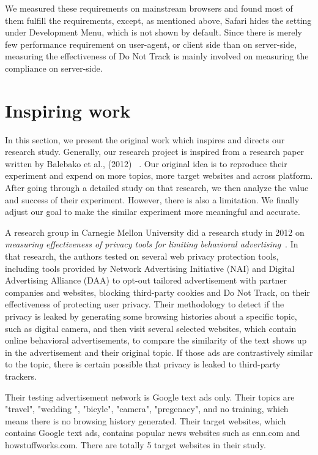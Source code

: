 \documentclass{sig-alternate}
\begin{document}
We measured these requirements on mainstream browsers and found most of them fulfill the requirements, except, as mentioned above, Safari hides the setting under Development Menu, which is not shown by default. Since there is merely few performance requirement on user-agent, or client side than on server-side, measuring the effectiveness of Do Not Track is mainly involved on measuring the compliance on server-side. 


\section{Inspiring work} \label{sec:lorrie}

In this section, we present the original work which inspires and directs our research study. Generally, our research project is inspired from a research paper written by Balebako et al., (2012) ~\cite{balebako2012measuring}. Our original idea is to reproduce their experiment and expend on more topics, more target websites and across platform. After going through a detailed study on that research, we then analyze the value and success of their experiment. However, there is also a limitation. We finally adjust our goal to make the similar experiment more meaningful and accurate.

A research group in Carnegie Mellon University did a research study in 2012 on \emph{measuring effectiveness of privacy tools for limiting behavioral advertising}~\cite{balebako2012measuring}. In that research, the authors tested on several web privacy protection tools, including tools provided by Network Advertising Initiative (NAI) and Digital Advertising Alliance (DAA) to opt-out tailored advertisement with partner companies and websites, blocking third-party cookies and Do Not Track, on their effectiveness of protecting user privacy. Their methodology to detect if the privacy is leaked by generating some browsing histories about a specific topic, such as digital camera, and then visit several selected websites, which contain online behavioral advertisements, to compare the similarity of the text shows up in the advertisement and their original topic. If those ads are contrastively similar to the topic, there is certain possible that privacy is leaked to third-party trackers.

Their testing advertisement network is Google text ads only. Their topics are "travel", "wedding ", "bicyle", "camera", "pregenacy", and no training, which means there is no browsing history generated. Their target websites, which contains Google text ads, contains popular news websites such as cnn.com and howstuffworks.com. There are totally 5 target websites in their study.
\end{document}
